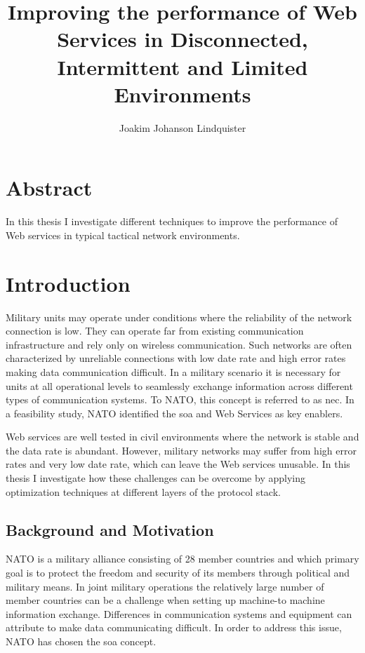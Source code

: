 \documentclass[USenglish]{ifimaster}
\title{Improving the performance of Web Services in Disconnected, Intermittent
and Limited Environments}
\author{Joakim Johanson Lindquister}
\begin{document}
\ififorside{}

\chapter*{Abstract}
In this thesis I investigate different techniques to improve the performance of
Web services in typical tactical network environments.
\pagebreak

\tableofcontents
\printglossaries
\listoftables
\listoffigures

\pagebreak


\chapter{Introduction}
Military units may operate under conditions where the reliability of the network
connection is low. They can operate far from existing communication
infrastructure and rely only on wireless communication. Such networks are often
characterized by unreliable connections with low date rate and high error rates
making data communication difficult. In a military scenario it is necessary for
units at all operational levels to seamlessly exchange information across
different types of communication systems. To NATO, this concept is referred to
as \gls{nec}. In a feasibility study, NATO identified the \gls{soa} and Web
Services as key enablers\cite{nnec-study}.

Web services are well tested in civil environments where the network is stable
and the data rate is abundant. However, military networks may suffer from high
error rates and very low date rate, which can leave the Web services unusable.
In this thesis I investigate how these challenges can be overcome by applying
optimization techniques at different layers of the protocol stack.

\section{Background and Motivation}
NATO is a military alliance consisting of 28 member
countries\cite{nato-homepage-member-countries} and which primary goal is to
protect the freedom and security of its members through political and military
means. In joint military operations the relatively large number of member
countries can be a challenge when setting up machine-to machine information
exchange. Differences in communication systems and equipment can attribute to
make data communicating difficult. In order to address this issue, NATO has
chosen the \gls{soa} concept\cite{IST-090}.
\end{document}
